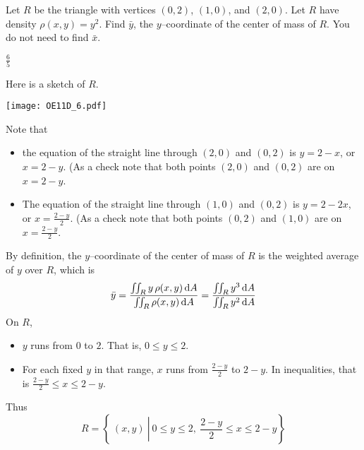 \begin{question}[M200 2011D] %
Let $R$ be the triangle with vertices $(0, 2)$, $(1, 0)$, and $(2, 0)$. 
Let $R$ have density  $\rho(x, y) = y^2$.
Find $\bar y$, the $y$--coordinate of the center of mass of $R$. 
You do not need to find $\bar x$.
\end{question}

%

\begin{answer}
$\frac{6}{5}$
\end{answer}

\begin{solution}
Here is a sketch of $R$.
\begin{center}
     \texttt{[image: OE11D\_6.pdf]}
\end{center}
Note that
\begin{itemize}
\item
 the equation of the straight line through $(2,0)$ and $(0,2)$
 is $y=2-x$, or $x=2-y$. (As a check note that both points $(2,0)$ and $(0,2)$
  are on $x=2-y$.
\item
 The equation of the straight line through $(1,0)$ and $(0,2)$
 is $y=2-2x$, or $x=\frac{2-y}{2}$. (As a check note that both points 
 $(0,2)$ and $(1,0)$ are on $x=\frac{2-y}{2}$.
\end{itemize}
By definition, the $y$--coordinate of the center of mass of $R$
is the weighted average of $y$ over $R$, which is
\begin{equation*}
\bar y =\frac{\iint_R y\,\rho(x,y)\,\mathrm{d}A}{\iint_R \rho(x,y)\,\mathrm{d}A}
       =\frac{\iint_R y^3\,\mathrm{d}A}{\iint_R y^2\,\mathrm{d}A}
\end{equation*} 
On $R$,
\begin{itemize}
\item
$y$ runs from $0$ to $2$. That is, $0\le y\le 2$.
\item
For each fixed $y$ in that range, $x$ runs from $\frac{2-y}{2}$ to
$2-y$. In inequalities, that is $\frac{2-y}{2}\le x\le 2-y$.
\end{itemize}
Thus
\begin{equation*}
R = \left\{\ (x,y)\ \left|\ 0\le y\le 2,\ \frac{2-y}{2}\le x\le 2-y
                                     \right.\right\}
\end{equation*}


\end{solution}
